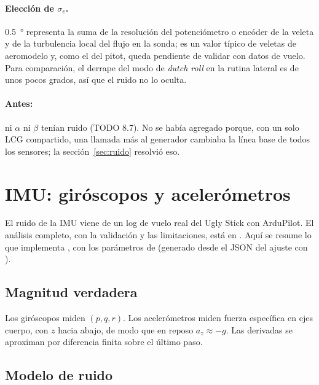 \documentclass[11pt,a4paper]{article}
\begin{document}
\paragraph{Elección de $\sigma_v$.} \SI{0.5}{\degree} representa la suma de la
resolución del potenciómetro o encóder de la veleta y de la turbulencia local
del flujo en la sonda; es un valor típico de veletas de aeromodelo y, como el
del pitot, queda pendiente de validar con datos de vuelo. Para comparación, el
derrape del modo de \emph{dutch roll} en la rutina lateral es de unos pocos
grados, así que el ruido no lo oculta.

\paragraph{Antes:} ni $\alpha$ ni $\beta$ tenían ruido (TODO 8.7). No se
había agregado porque, con un solo LCG compartido, una llamada más al
generador cambiaba la línea base de todos los sensores; la
sección~\ref{sec:ruido} resolvió eso.

\section{IMU: giróscopos y acelerómetros}
\label{sec:imu}

El ruido de la IMU viene de un log de vuelo real del Ugly Stick con ArduPilot.
El análisis completo, con la validación y las limitaciones, está en
. Aquí se resume lo que implementa
, con los parámetros de 
(generado desde el JSON del ajuste con ).

\subsection{Magnitud verdadera}

Los giróscopos miden $(p,q,r)$. Los acelerómetros miden fuerza específica en ejes
cuerpo, con $z$ hacia abajo, de modo que en reposo $a_z \approx -g$. Las
derivadas se aproximan por diferencia finita sobre el último paso.

\subsection{Modelo de ruido}
\end{document}
